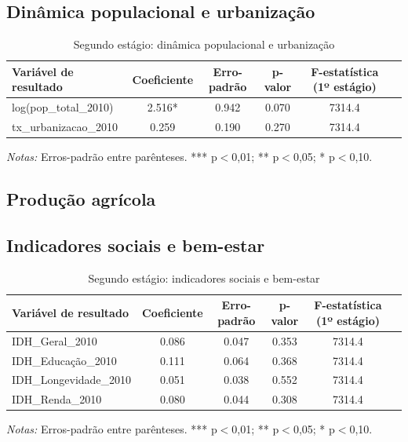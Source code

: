 \documentclass[12pt,a4paper]{article}
\begin{document}
\subsection{Dinâmica populacional e urbanização}
\begin{table}[htbp]
\centering
\scriptsize
\caption{Segundo estágio: dinâmica populacional e urbanização}
\label{tab:segundo_estagio_populacao}
\begin{tabular}{lccccc}
\toprule
Variável de resultado & Coeficiente & Erro-padrão & p-valor & F-estatística (1º estágio) \\
\midrule
log(pop_total_2010) & 2.516* & 0.942 & 0.070 & 7314.4 \\
tx_urbanizacao_2010 & 0.259 & 0.190 & 0.270 & 7314.4 \\
\bottomrule
\end{tabular}
\begin{minipage}{0.95\textwidth}
\scriptsize \textit{Notas:} Erros-padrão entre parênteses. *** p$<$0,01; ** p$<$0,05; * p$<$0,10.
\end{minipage}
\end{table}

\subsection{Produção agrícola}

\subsection{Indicadores sociais e bem-estar}
\begin{table}[htbp]
\centering
\scriptsize
\caption{Segundo estágio: indicadores sociais e bem-estar}
\label{tab:segundo_estagio_social}
\begin{tabular}{lccccc}
\toprule
Variável de resultado & Coeficiente & Erro-padrão & p-valor & F-estatística (1º estágio) \\
\midrule
IDH_Geral_2010 & 0.086 & 0.047 & 0.353 & 7314.4 \\
IDH_Educação_2010 & 0.111 & 0.064 & 0.368 & 7314.4 \\
IDH_Longevidade_2010 & 0.051 & 0.038 & 0.552 & 7314.4 \\
IDH_Renda_2010 & 0.080 & 0.044 & 0.308 & 7314.4 \\
\bottomrule
\end{tabular}
\begin{minipage}{0.95\textwidth}
\scriptsize \textit{Notas:} Erros-padrão entre parênteses. *** p$<$0,01; ** p$<$0,05; * p$<$0,10.
\end{minipage}
\end{table}
\end{document}
